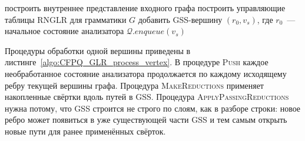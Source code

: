 \begin{algorithm}
    построить внутреннее представление входного графа\;
    построить управляющие таблицы RNGLR для грамматики $G$\;
    добавить GSS-вершину $(r_0, v_s)$, где $r_0$~--- начальное состояние анализатора\;
    $\mathcal{Q}.\mathit{enqueue}(v_s)$\;
    \caption{Обобщённый RNGLR-алгоритм для поиска путей с КС-ограничениями}
    \label{algo:CFPQ_GLR_main}
\end{algorithm}

Процедуры обработки одной вершины приведены в листинге~\ref{algo:CFPQ_GLR_process_vertex}.
В процедуре \textsc{Push} каждое необработанное состояние анализатора продолжается по каждому исходящему ребру текущей вершины графа.
Процедура \textsc{MakeReductions} применяет накопленные свёртки вдоль путей в GSS.
Процедура \textsc{ApplyPassingReductions} нужна потому, что GSS строится не строго по слоям, как в разборе строки: новое ребро может появиться в уже существующей части GSS и тем самым открыть новые пути для ранее применённых свёрток.

